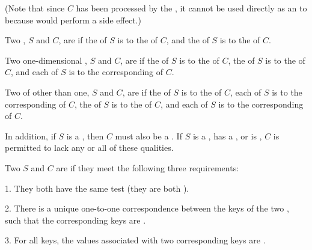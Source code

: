 (Note that since $C$ has been processed by the ,
it cannot be used directly as an  to 
because  would perform a side effect.)


Two , $S$ and $C$, are  if
    the  of $S$ is  to the  of $C$,
and the  of $S$ is  to the  of $C$.


Two one-dimensional , $S$ and $C$, are  if
     the  of $S$ is  to the  of $C$,
     the  of $S$ is  to
     the  of $C$,
 and each   of $S$ is  to
      the corresponding  of $C$.

Two  of  other than one, $S$ and $C$, are  if
     the  of $S$ is  to the  of $C$,
     each  of $S$ is  to 
      the corresponding  of $C$,
     the  of $S$ is  to
     the  of $C$,
 and each  of $S$ is  to
      the corresponding  of $C$.

In addition,
if $S$ is a , then $C$ must also be a .
If $S$ is a ,
       has a ,
    or is , 
$C$ is permitted to lack any or all of these qualities.


Two  $S$ and $C$ are  if they meet the following
three requirements:
 
\beginlist
\item{1.}  They both have the same test 
 	    (\eg they are both  ).
 
\item{2.}  There is a unique one-to-one correspondence between the keys of
           the two , such that the corresponding keys are 
	   .

\item{3.}  For all keys, the values associated with two corresponding keys
           are .
\endlist
 
